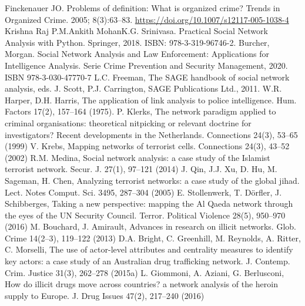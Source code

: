 \documentclass[runningheads]{llncs}
\begin{document}
%
%
%
% 
% 
%
\renewcommand{\refname}{Referencias Bibliográficas}
\begin{thebibliography}{8}
Finckenauer JO. Problems of definition: What is organized crime? Trends in Organized Crime. 2005; 8(3):63–83. \url{https://doi.org/10.1007/s12117-005-1038-4}
Krishna Raj P.M.Ankith MohanK.G. Srinivasa. Practical Social Network Analysis with Python. Springer, 2018. ISBN: 978-3-319-96746-2.
Burcher, Morgan. Social Network Analysis and Law Enforcement: Applications for Intelligence Analysis. Serie Crime Prevention and Security Management, 2020. ISBN 978-3-030-47770-7
L.C. Freeman, The SAGE handbook of social network analysis, eds. J. Scott, P.J. Carrington, SAGE Publications Ltd., 2011.
W.R. Harper, D.H. Harris, The application of link analysis to police intelligence. Hum. Factors 17(2), 157–164 (1975).
P. Klerks, The network paradigm applied to criminal organisations: theoretical nitpicking or relevant doctrine for investigators? Recent developments in the Netherlands. Connections 24(3), 53–65 (1999)
V. Krebs, Mapping networks of terrorist cells. Connections 24(3), 43–52 (2002)
R.M. Medina, Social network analysis: a case study of the Islamist terrorist network. Secur. J. 27(1), 97–121 (2014)
J. Qin, J.J. Xu, D. Hu, M. Sageman, H. Chen, Analyzing terrorist networks: a case study of the global jihad. Lect. Notes Comput. Sci. 3495, 287–304 (2005)
E. Stollenwerk, T. Dörfler, J. Schibberges, Taking a new perspective: mapping the Al Qaeda network through the eyes of the UN Security Council. Terror. Political Violence 28(5), 950–970  (2016)
M. Bouchard, J. Amirault, Advances in research on illicit networks. Glob. Crime 14(2–3), 119–122 (2013)
D.A. Bright, C. Greenhill, M. Reynolds, A. Ritter, C. Morselli, The use of actor-level attributes and centrality measures to identify key actors: a case study of an Australian drug trafficking network. J. Contemp. Crim. Justice 31(3), 262–278 (2015a)
L. Giommoni, A. Aziani, G. Berlusconi, How do illicit drugs move across countries? a network analysis of the heroin supply to Europe. J. Drug Issues 47(2), 217–240 (2016)

\end{thebibliography}
\end{document}
